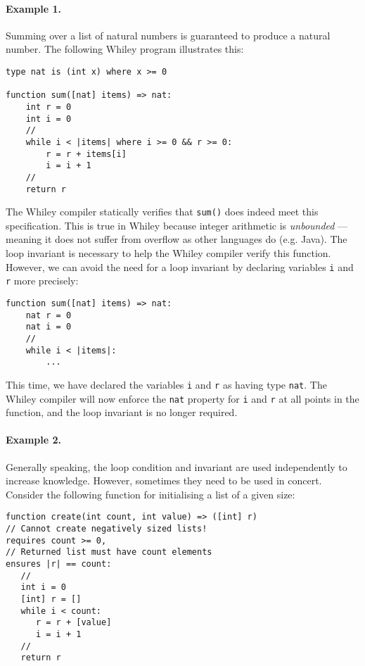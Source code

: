 \paragraph{Example 1.} Summing over a list of natural numbers is
guaranteed to produce a natural number.  The following Whiley program
illustrates this:

\begin{lstlisting}
type nat is (int x) where x >= 0

function sum([nat] items) => nat:
    int r = 0
    int i = 0
    //
    while i < |items| where i >= 0 && r >= 0:
        r = r + items[i]
        i = i + 1
    //
    return r
\end{lstlisting}
The Whiley compiler statically verifies that \lstinline{sum()} does
indeed meet this specification.  This is true in Whiley because
integer arithmetic is {\em unbounded} --- meaning it does not suffer
from overflow as other languages do (e.g. Java).  The loop invariant
is necessary to help the Whiley compiler verify this function.
However, we can avoid the need for a loop invariant by declaring
variables \lstinline{i} and \lstinline{r} more precisely:
\begin{lstlisting}
function sum([nat] items) => nat:
    nat r = 0
    nat i = 0
    //
    while i < |items|:
        ...
\end{lstlisting}

This time, we have declared the variables \lstinline{i} and
\lstinline{r} as having type \lstinline{nat}.  The Whiley compiler
will now enforce the \lstinline{nat} property for \lstinline{i} and
\lstinline{r} at all points in the function, and the loop invariant is
no longer required.

\paragraph{Example 2.}  Generally speaking, the loop condition and
invariant are used independently to increase knowledge.  However,
sometimes they need to be used in concert.  Consider the following
function for initialising a list of a given size:

\begin{lstlisting}
function create(int count, int value) => ([int] r)
// Cannot create negatively sized lists!
requires count >= 0, 
// Returned list must have count elements
ensures |r| == count:
   //
   int i = 0
   [int] r = []
   while i < count:
      r = r + [value]
      i = i + 1
   //
   return r
\end{lstlisting}

